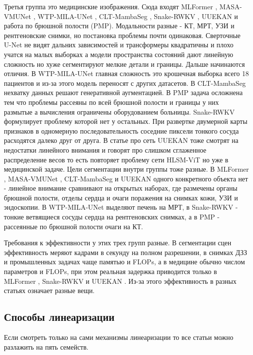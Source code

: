 \documentclass[areasetadvanced]{scrartcl}
\begin{document}
		Третья группа это медицинские изображения. Сюда входят MLFormer \cite{mlformer}, MASA-VMUNet \cite{masavmunet},
		WTP-MILA-UNet \cite{wtpmilaunet}, CLT-MambaSeg \cite{cltmambaseg}, Snake-RWKV \cite{snakerwkv}, UUEKAN \cite{uuekan} и работа по брюшной полости \cite{pmp} (PMP). 
		Модальности разные - КТ, МРТ, УЗИ и рентгеновские снимки, но постановка
		проблемы почти одинаковая. Сверточные U-Net не видят дальних зависимостей и трансформеры квадратичны и плохо учатся на малых выборках а модели
		пространства состояний дают линейную сложность но хуже сегментируют мелкие детали и границы. Дальше начинаются отличия. В WTP-MILA-UNet \cite{wtpmilaunet}
		главная сложность это крошечная выборка всего 18 пациентов и из-за этого модель переносят с других датасетов. В CLT-MambaSeg \cite{cltmambaseg}
		нехватку данных решают генеративной аугментацией. В PMP \cite{pmp} задача осложнена тем что проблемы рассеяны по всей брюшной полости и границы
		у них размытые а вычисления ограничены оборудованием больницы. Snake-RWKV \cite{snakerwkv} формулирует проблему которой нет у остальных.
		При развертке двумерной карты признаков в одномерную последовательность соседние пиксели тонкого сосуда расходятся далеко друг от друга. 
		В статье про сеть UUEKAN \cite{uuekan} тоже смотрят на недостатки линейного внимания и говорят про
		слишком сглаженное распределение весов то есть повторяет проблему сети HLSM-ViT \cite{hlsmvit} но уже в медицинской задаче.
		Цели сегментации внутри группы тоже разные. В MLFormer \cite{mlformer}, MASA-VMUNet \cite{masavmunet}, CLT-MambaSeg \cite{cltmambaseg} и
		UUEKAN \cite{uuekan} одного конкретного объекта нет - линейное внимание сравнивают на открытых наборах, где размечены органы брюшной полости,
		отделы сердца и очаги поражения на снимках кожи, УЗИ и эндоскопии. В WTP-MILA-UNet \cite{wtpmilaunet} выделяют печень на МРТ, в
		Snake-RWKV \cite{snakerwkv} - тонкие ветвящиеся сосуды сердца на рентгеновских снимках, а в PMP \cite{pmp} - рассеянные по брюшной полости
		очаги на КТ.

		Требования к эффективности у этих трех групп разные. В сегментации сцен эффективность меряют кадрами в секунду на полном разрешении,
		в снимках ДЗЗ и промышленных задачах чаще памятью и FLOPs, а в медицине обычно числом параметров и FLOPs, при этом реальная задержка приводится
		только в MLFormer \cite{mlformer}, Snake-RWKV \cite{snakerwkv} и UUEKAN \cite{uuekan}. Из-за этого эффективность в разных
		статьях означает разные вещи. 

	\subsection{Способы линеаризации}
		Если смотреть только на сами механизмы линеаризации то все статьи можно разлажить на пять семейств.
\end{document}
